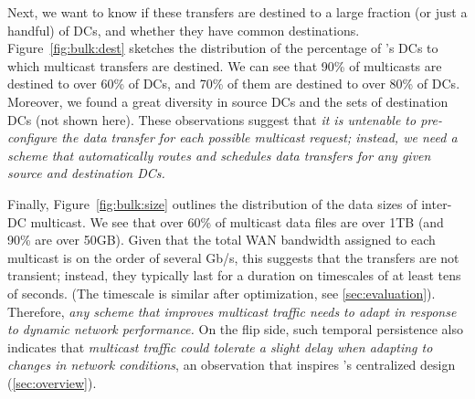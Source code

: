 \vspace{0.1cm}
Next, we want to know if these transfers are destined to
a large fraction (or just a handful) of DCs, and whether
they have common destinations.
Figure~\ref{fig:bulk:dest} sketches the distribution of the
percentage of \company's DCs to which multicast
transfers are destined.
We can see that 90\% of multicasts are destined
to over 60\% of DCs, and 70\% of them are destined
to over 80\% of DCs.
Moreover, we found a great diversity in
source DCs and the sets of destination DCs (not shown here).
These observations suggest that {\em it is untenable
to pre-configure the data transfer for each possible multicast
request; instead, we need a scheme that automatically routes and
schedules data transfers for any given source and destination
DCs.}


Finally, Figure~\ref{fig:bulk:size} outlines the distribution of
the data sizes of inter-DC multicast.
We see that over 60\% of multicast data files are over 1TB
(and 90\% are over 50GB).
Given that the total WAN bandwidth assigned to each multicast
is on the order of several Gb/s,
this suggests that the transfers are not transient; instead, they
typically last for a duration on timescales of at least tens of
seconds. (The timescale is similar after optimization, see \Section\ref{sec:evaluation}).
Therefore, {\em any scheme that improves multicast traffic needs to
adapt in response to dynamic network performance.}
On the flip side, such temporal persistence
also indicates that {\em multicast traffic could tolerate a
slight delay
when adapting to changes in network conditions}, an observation
that inspires
\name's centralized design (\Section\ref{sec:overview}).


